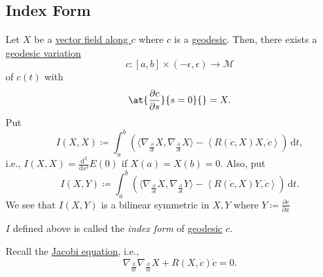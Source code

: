 \subsection{Index Form}
Let \(X\) be a \hyperref[def:vector-field-along-curve]{vector field along \(c\)} where \(c\) is a \hyperref[def:geodesic]{geodesic}. Then, there exists a \hyperref[def:geodesic-variation]{geodesic variation}
\[
	c\colon [a, b] \times (-\epsilon , \epsilon )\to \mathcal{M}
\]
of \(c(t)\) with
\[
	\at{\frac{\partial c}{\partial s} }{s=0}{} = X.
\]
Put
\[
	I(X, X)
	\coloneqq \int_{a}^{b} \left( \langle \nabla _{\frac{\partial }{\partial t} }X, \nabla _{\frac{\partial }{\partial t} } X \rangle - \left\langle R(\dot{c}, X )X, \dot{c}  \right\rangle  \right)  \,\mathrm{d}t,
\]
i.e., \(I(X, X) = \frac{\mathrm{d}^2}{\mathrm{d}s^2} E(0)\) if \(X(a) = X(b) = 0\). Also, put
\[
	I(X, Y)
	\coloneqq \int_{a}^{b} \left( \langle \nabla _{\frac{\partial }{\partial t} } X, \nabla _{\frac{\partial }{\partial t} } Y \rangle - \left\langle R(\dot{c} , X) Y, \dot{c} \right\rangle \right)  \,\mathrm{d}t.
\]
We see that \(I(X, Y)\) is a bilinear symmetric in \(X, Y\) where \(Y\coloneqq \frac{\partial c}{\partial x} \)

\begin{definition}\label{def:index-form}
	\(I\) defined above is called the \emph{index form} of \hyperref[def:geodesic]{geodesic} \(c\).
\end{definition}

\begin{prev}
	Recall the \hyperref[eq:Jacobi]{Jacobi equation}, i.e.,
	\[
		\nabla _{\frac{\mathrm{d}}{\mathrm{d}t} }\nabla _{\frac{\mathrm{d}}{\mathrm{d}t} }X + R(X, \dot{c} )\dot{c} = 0.
	\]
\end{prev}

